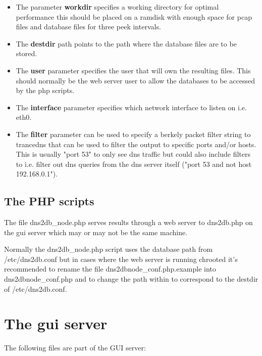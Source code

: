 \documentclass[a4paper]{article}
\begin{document}
\begin{itemize}
\item The parameter \textbf{workdir} specifies a working directory for optimal performance this 
should be placed on a ramdisk with enough space for pcap files and database 
files for three peek intervals.

\item The  \textbf{destdir} path points to the path where the database files are to be stored.
\item The  \textbf{user} parameter specifies the user that will own the resulting files. 
This should normally be the web server user to allow the databases to be 
accessed by the php scripts.
\item The  \textbf{interface} parameter specifies which network interface to listen on i.e. eth0.
\item The \textbf{filter} parameter can be used to specify a berkely packet filter 
string to trancedns that can be used to filter the output to specific ports 
and/or hosts. This is usually "port 53" to only see dns traffic but could also 
include filters to i.e. filter out dns queries from the dns server itself ("port 53 and not host 192.168.0.1").
\end{itemize}

\subsection{The PHP scripts}
The file dns2db\_node.php serves results through a web server to dns2db.php 
on the gui server which may or may not be the same machine. 

Normally the dns2db\_node.php script uses the database path 
from /etc/dns2db.conf but in cases where the web server is running chrooted 
it's recommended to rename the file dns2dbnode\_conf.php.example into 
dns2dbnode\_conf.php and to change the path within to correspond to 
the destdir of /etc/dns2db.conf.


\newpage
\section{The gui server}
The following files are part of the GUI server:
\end{document}
